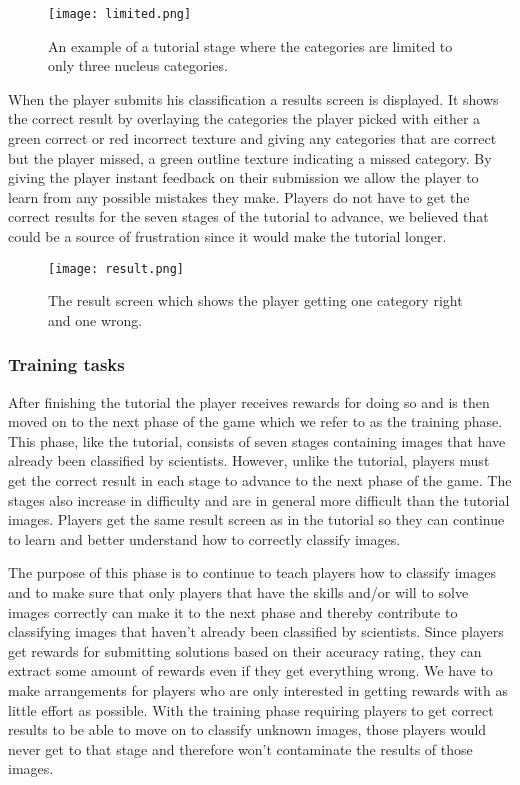 		\begin{figure}[H]
		  \centering
		  \graphicspath{ {./graphics/} }
		  \centerline{\texttt{[image: limited.png]}}
		  \caption{\label{fig:limited}An example of a tutorial stage where the categories are limited to only three nucleus categories.}
		\end{figure}

		When the player submits his classification a results screen is displayed. It shows the correct result by overlaying the categories the player picked with either a green correct or red incorrect texture and giving any categories that are correct but the player missed, a green outline texture indicating a missed category. By giving the player instant feedback on their submission we allow the player to learn from any possible mistakes they make. Players do not have to get the correct results for the seven stages of the tutorial to advance, we believed that could be a source of frustration since it would make the tutorial longer. 

		\begin{figure}[H]
		  \centering
		  \graphicspath{ {./graphics/} }
		  \centerline{\texttt{[image: result.png]}}
		  \caption{\label{fig:result}The result screen which shows the player getting one category right and one wrong.}
		\end{figure}

	\subsubsection{Training tasks}
		After finishing the tutorial the player receives rewards for doing so and is then moved on to the next phase of the game which we refer to as the training phase. This phase, like the tutorial, consists of seven stages containing images that have already been classified by scientists. However, unlike the tutorial, players must get the correct result in each stage to advance to the next phase of the game. The stages also increase in difficulty and are in general more difficult than the tutorial images. Players get the same result screen as in the tutorial so they can continue to learn and better understand how to correctly classify images. 

		The purpose of this phase is to continue to teach players how to classify images and to make sure that only players that have the skills and/or will to solve images correctly can make it to the next phase and thereby contribute to classifying images that haven't already been classified by scientists. Since players get rewards for submitting solutions based on their accuracy rating, they can extract some amount of rewards even if they get everything wrong. We have to make arrangements for players who are only interested in getting rewards with as little effort as possible. With the training phase requiring players to get correct results to be able to move on to classify unknown images, those players would never get to that stage and therefore won't contaminate the results of those images. 

